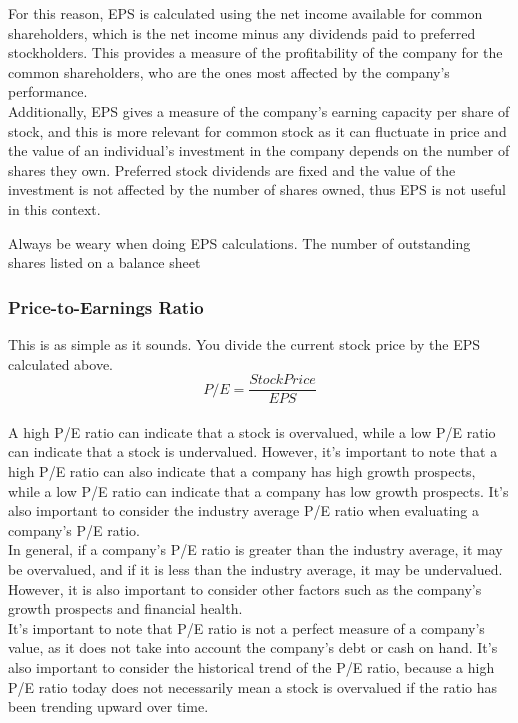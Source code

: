 \documentclass{article}
\begin{document}
For this reason, EPS is calculated using the net income available for common shareholders, which is the net income minus any dividends paid to preferred stockholders. This provides a measure of the profitability of the company for the common shareholders, who are the ones most affected by the company's performance.\\

Additionally, EPS gives a measure of the company's earning capacity per share of stock, and this is more relevant for common stock as it can fluctuate in price and the value of an individual's investment in the company depends on the number of shares they own. Preferred stock dividends are fixed and the value of the investment is not affected by the number of shares owned, thus EPS is not useful in this context.

Always be weary when doing EPS calculations. The number of outstanding shares listed on a balance sheet
\subsubsection{Price-to-Earnings Ratio}
This is as simple as it sounds. You divide the current stock price by the EPS calculated above.
\begin{equation}
    P/E = \frac{Stock Price}{EPS}
\end{equation}\\

A high P/E ratio can indicate that a stock is overvalued, while a low P/E ratio can indicate that a stock is undervalued. However, it's important to note that a high P/E ratio can also indicate that a company has high growth prospects, while a low P/E ratio can indicate that a company has low growth prospects. It's also important to consider the industry average P/E ratio when evaluating a company's P/E ratio.\\

In general, if a company's P/E ratio is greater than the industry average, it may be overvalued, and if it is less than the industry average, it may be undervalued. However, it is also important to consider other factors such as the company's growth prospects and financial health.\\

It's important to note that P/E ratio is not a perfect measure of a company's value, as it does not take into account the company's debt or cash on hand. It's also important to consider the historical trend of the P/E ratio, because a high P/E ratio today does not necessarily mean a stock is overvalued if the ratio has been trending upward over time.\\
\end{document}
